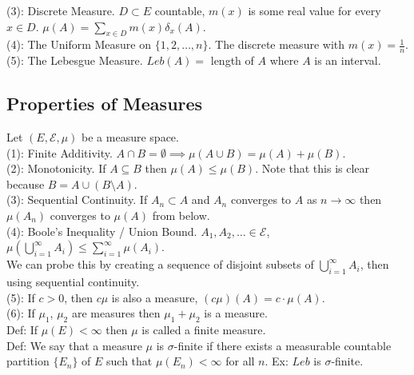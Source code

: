 \documentclass[english, 11pt]{article}
\begin{document}
(3): Discrete Measure. $D \subset E$ countable, $m(x)$ is some real value for every $x \in D$. $\mu(A) = \sum_{x \in D} m(x)\delta_x(A)$.\\

(4): The Uniform Measure on $\{1, 2, \dots, n\}$. The discrete measure with $m(x) = \frac{1}{n}$.\\

(5): The Lebesgue Measure. $Leb(A) =$ length of $A$ where $A$ is an interval.\\

\subsection{Properties of Measures}

Let $(E, \mathcal{E}, \mu)$ be a measure space.\\

(1): Finite Additivity. $A \cap B = \emptyset \implies \mu (A \cup B) = \mu(A) + \mu(B)$.\\

(2): Monotonicity. If $A \subseteq B$ then $\mu(A) \leq \mu(B)$. Note that this is clear because $B = A \cup (B \setminus A)$.\\

(3): Sequential Continuity. If $A_n \subset A$ and $A_n$ converges to $A$ as $n \to \infty$ then $\mu(A_n)$ converges to $\mu(A)$ from below.\\

(4): Boole's Inequality / Union Bound. $A_1, A_2, \dots \in \mathcal{E}$, $\mu(\bigcup^\infty_{i = 1} A_i) \leq \sum_{i = 1}^\infty \mu(A_i)$.\\

We can probe this by creating a sequence of disjoint subsets of $\bigcup_{i = 1}^\infty A_i$, then using sequential continuity.\\

(5): If $c > 0$, then $c\mu$ is also a measure, $(c\mu)(A) = c \cdot \mu(A)$.\\

(6): If $\mu_1$, $\mu_2$ are measures then $\mu_1 + \mu_2$ is a measure.\\

Def: If $\mu(E) < \infty$ then $\mu$ is called a finite measure.\\

Def: We say that a measure $\mu$ is $\sigma$-finite if there exists a measurable countable partition $\{E_n\}$ of $E$ such that $\mu(E_n) < \infty$ for all $n$. Ex: $Leb$ is $\sigma$-finite.\\
\end{document}
